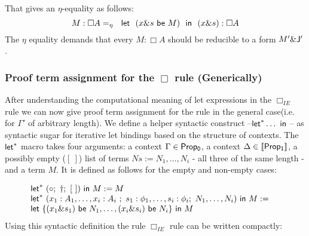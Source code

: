         That gives an $\eta$-equality as follows:
        {\small
            $$M:\Box A =_{\eta}\ \ {\sf let} \ \ (x \& s\  {\sf be} \ M)\ \ {\sf in}\ \  { (x \& s)}:\Box A$$
        }
        The $\eta$ equality demands that every $M:\Box A$ should be reducible to a form $M'\& {\sf J^{\prime}}$.  
        \subsubsection{Proof term assignment for the $\Box$ rule (Generically)}
        After understanding the computational meaning of let expressions in the $\Box_{IE}$ rule 
        we can now give  proof term assignment  for the rule in the general case(i.e. for $\Gamma'$ of arbitrary length). 
        We define a helper syntactic construct --${\sf let}^{*}\ldots {\ \sf in\ }$-- as syntactic sugar for iterative  let bindings based on the structure  of contexts.
        The ${\sf let}^{*}$ macro takes four arguments: a context $\Gamma\in {\sf Prop_0}$, a  context $\Delta\in{\sf \llbracket Prop_1\rrbracket}$,  
        a possibly empty ($[\ ]$) list of terms  $Ns:=N_1,\ldots,  N_i$ - all three of the same length - and a term $M$. It is defined as follows for the empty and non-empty cases:
        
        {\small
            $$\begin{array}{ll}
            \nonumber {\sf let}^{*}\ (\circ;\ \dagger;\  [\ ]) {\ \sf in\ }  M:= M \  &\\
            \nonumber {\sf let}^{*}\ (x_1:A_1,\ldots, x_i:A_i\ ;\  s_1: \phi_1, \ldots, s_i:\phi_i;\  N_1,\ldots,  N_i) {\ \sf in\ } M:= \  & \\
            {\sf let} \ \{(x_1 \& s_1)\  {\sf be}\  N_1,\ldots,  (x_i \& s_i)\  {\sf be}\  N_i\}\ {\sf in}\  M &\\
            \end{array}$$}
        Using this syntactic definition the rule $\Box_{IE}$ rule  can be written compactly:
        

